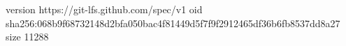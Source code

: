 version https://git-lfs.github.com/spec/v1
oid sha256:068b9f68732148d2bfa050bac4f81449d5f7f9f2912465df36b6fb8537dd8a27
size 11288
